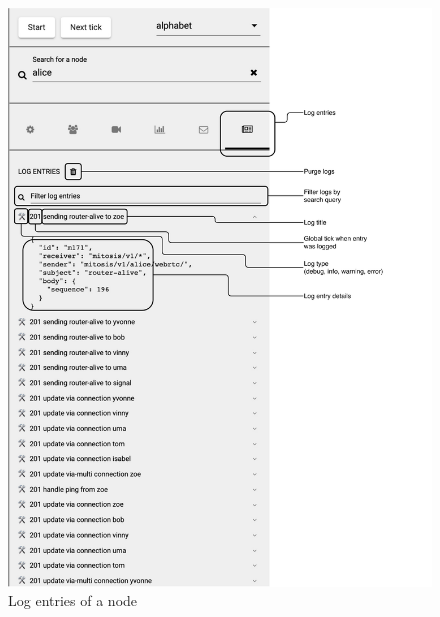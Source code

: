 \begin{figure}
\centering
\includegraphics[width=1\textwidth]{graphics/analysis-tools/visualisation-sidebar-log-explorer.pdf}
\caption{Log entries of a node}
\label{fig:anl-sim-log-explorer}
\end{figure}